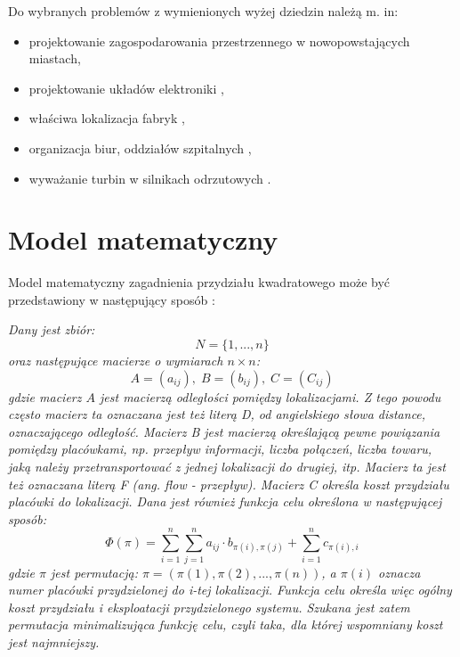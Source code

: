 Do wybranych problemów z wymienionych wyżej dziedzin należą m. in:
\begin{itemize}
\item projektowanie zagospodarowania przestrzennego w nowopowstających miastach,
\item projektowanie układów elektroniki \cite{QAP_DEF_CHMIEL},
\item właściwa lokalizacja fabryk \cite{QAP_DEF_CHMIEL},
\item organizacja biur, oddziałów szpitalnych \cite{QAP_DEF_CHMIEL},
\item wyważanie turbin w silnikach odrzutowych  \cite{QAP_DEF_CHMIEL}.
\end{itemize}

\section{Model matematyczny}
\label{sec:model}
Model matematyczny zagadnienia przydziału kwadratowego może być przedstawiony w następujący sposób \cite{QAP_DEF_CHMIEL}:

\textit{Dany jest zbiór:}
\newline
\begin{equation}
N=\{1,...,n\}
\end{equation}
\newline
\textit{oraz następujące macierze o wymiarach $n\times n$:}
\newline
\begin{equation}
A=(a_{ij}),\; B=(b_{ij}),\; C=(C_{ij})
\end{equation}
\newline
\textit{gdzie macierz $A$ jest macierzą odległości pomiędzy lokalizacjami. Z tego powodu często macierz ta oznaczana jest też literą D, od angielskiego słowa distance, oznaczającego odległość. Macierz B jest macierzą określającą pewne powiązania pomiędzy placówkami, np. przepływ informacji, liczba połączeń, liczba towaru, jaką należy przetransportować z jednej lokalizacji do drugiej, itp. Macierz ta jest też oznaczana literą F (ang. flow - przepływ). Macierz C określa  koszt przydziału  placówki do lokalizacji.
Dana jest również funkcja celu określona w następującej sposób:}
\newline
\begin{equation}
\label{QAP_FC}
\Phi(\pi)=\sum_{i=1}^n\sum_{j=1}^n a_{ij}\cdot b_{\pi(i),\pi(j)} + \sum_{i=1}^n c_{\pi(i),i}
\end{equation}
\newline
\textit{gdzie $\pi$ jest permutacją: $\pi=(\pi(1),\pi(2),...,\pi(n))$, a $\pi(i)$ oznacza numer placówki przydzielonej do {i-tej} lokalizacji. Funkcja celu określa więc ogólny koszt przydziału i eksploatacji przydzielonego systemu. Szukana jest zatem permutacja minimalizująca funkcję celu, czyli taka, dla której wspomniany koszt jest najmniejszy.}

